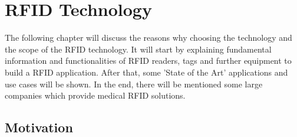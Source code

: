 
\chapter{RFID Technology}

The following chapter will discuss the reasons why choosing the technology and the scope of the RFID technology. It will start by explaining fundamental information and functionalities of RFID readers, tags and further equipment to build a RFID application. After that, some 'State of the Art' applications and use cases will be shown. In the end, there will be mentioned some large companies which provide medical RFID solutions.

\section{Motivation}

